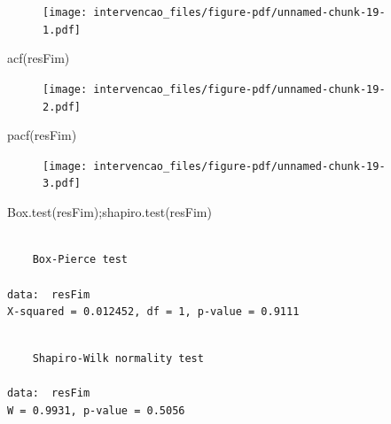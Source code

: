 \documentclass[
  letterpaper,
  DIV=11,
  numbers=noendperiod]{scrartcl}
\newenvironment{Shaded}{\begin{snugshade}}{\end{snugshade}}
\newcommand{\FunctionTok}[1]{\textcolor[rgb]{0.28,0.35,0.67}{#1}}
\newcommand{\NormalTok}[1]{\textcolor[rgb]{0.00,0.23,0.31}{#1}}
\theoremstyle{plain}
\theoremstyle{plain}
\theoremstyle{definition}
\theoremstyle{definition}
\theoremstyle{remark}
\begin{document}
\begin{figure}[H]

{\centering \texttt{[image: intervencao\_files/figure-pdf/unnamed-chunk-19-1.pdf]}

}

\end{figure}

\begin{Shaded}
\begin{Highlighting}[]
\FunctionTok{acf}\NormalTok{(resFim)}
\end{Highlighting}
\end{Shaded}

\begin{figure}[H]

{\centering \texttt{[image: intervencao\_files/figure-pdf/unnamed-chunk-19-2.pdf]}

}

\end{figure}

\begin{Shaded}
\begin{Highlighting}[]
\FunctionTok{pacf}\NormalTok{(resFim)}
\end{Highlighting}
\end{Shaded}

\begin{figure}[H]

{\centering \texttt{[image: intervencao\_files/figure-pdf/unnamed-chunk-19-3.pdf]}

}

\end{figure}

\begin{Shaded}
\begin{Highlighting}[]
\FunctionTok{Box.test}\NormalTok{(resFim);}\FunctionTok{shapiro.test}\NormalTok{(resFim)}
\end{Highlighting}
\end{Shaded}

\begin{verbatim}

    Box-Pierce test

data:  resFim
X-squared = 0.012452, df = 1, p-value = 0.9111
\end{verbatim}

\begin{verbatim}

    Shapiro-Wilk normality test

data:  resFim
W = 0.9931, p-value = 0.5056
\end{verbatim}
\end{document}
